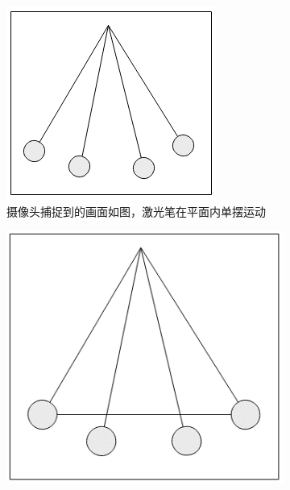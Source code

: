 \documentclass[scheme=chinese,a4paper]{article}
\begin{document}
\begin{figure}[H]
    \centering
    \begin{subfigure}[b]{0.3\textwidth}
      \centering
      \includegraphics[width=\textwidth]{a}
      \caption{摄像头捕捉到的画面如图，激光笔在平面内单摆运动\\}
      \label{fig:y equals x}
    \end{subfigure}
    \hfill
    \begin{subfigure}[b]{0.3\textwidth}
      \centering
      \includegraphics[width=\textwidth]{b}

\end{subfigure}
\end{figure}
\end{document}
